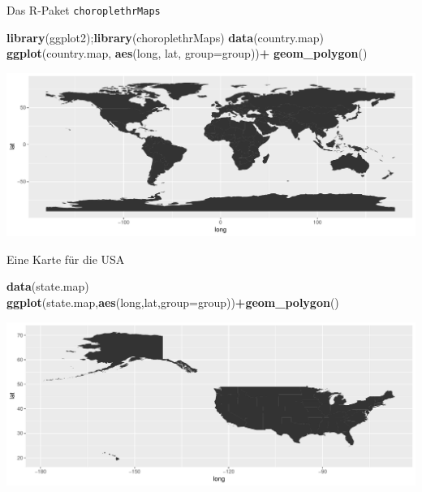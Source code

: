 \documentclass[ignorenonframetext,]{beamer}
\newenvironment{Shaded}{\begin{snugshade}}{\end{snugshade}}
\newcommand{\DataTypeTok}[1]{\textcolor[rgb]{0.13,0.29,0.53}{#1}}
\newcommand{\KeywordTok}[1]{\textcolor[rgb]{0.13,0.29,0.53}{\textbf{#1}}}
\newcommand{\NormalTok}[1]{#1}
\newcommand{\OperatorTok}[1]{\textcolor[rgb]{0.81,0.36,0.00}{\textbf{#1}}}
\newcommand{\StringTok}[1]{\textcolor[rgb]{0.31,0.60,0.02}{#1}}
\begin{document}
\begin{frame}[fragile]{Das R-Paket \texttt{choroplethrMaps}}
\protect\hypertarget{das-r-paket-choroplethrmaps}{}

\begin{Shaded}
\begin{Highlighting}[]
\KeywordTok{library}\NormalTok{(ggplot2);}\KeywordTok{library}\NormalTok{(choroplethrMaps)}
\KeywordTok{data}\NormalTok{(country.map)}
\KeywordTok{ggplot}\NormalTok{(country.map, }\KeywordTok{aes}\NormalTok{(long, lat, }\DataTypeTok{group=}\NormalTok{group))}\OperatorTok{+}\StringTok{ }
\StringTok{  }\KeywordTok{geom_polygon}\NormalTok{()}
\end{Highlighting}
\end{Shaded}

\includegraphics{A5_Choroplethen_files/figure-beamer/unnamed-chunk-34-1.pdf}

\end{frame}

\begin{frame}[fragile]{Eine Karte für die USA}
\protect\hypertarget{eine-karte-fur-die-usa}{}

\begin{Shaded}
\begin{Highlighting}[]
\KeywordTok{data}\NormalTok{(state.map)}
\KeywordTok{ggplot}\NormalTok{(state.map,}\KeywordTok{aes}\NormalTok{(long,lat,}\DataTypeTok{group=}\NormalTok{group))}\OperatorTok{+}\KeywordTok{geom_polygon}\NormalTok{()}
\end{Highlighting}
\end{Shaded}

\includegraphics{A5_Choroplethen_files/figure-beamer/unnamed-chunk-35-1.pdf}

\end{frame}
\end{document}
